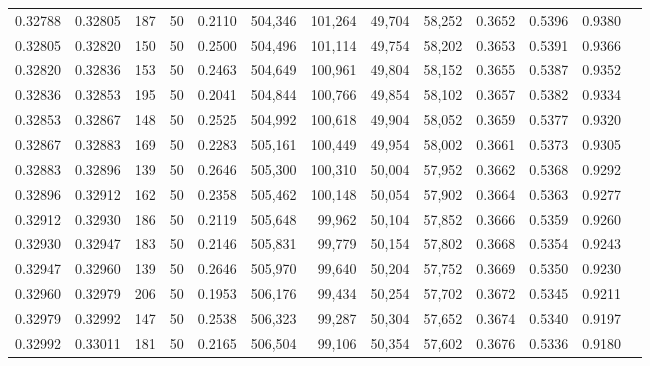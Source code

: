 \begin{tabular}{rrrrrrrrrrrrr}
0.32788 & 0.32805 &   187 &  50 &                                     0.2110 & 504,346 & 101,264 &  49,704 &  58,252 & 0.3652 & 0.5396 & 0.9380 \\
0.32805 & 0.32820 &   150 &  50 &                                     0.2500 & 504,496 & 101,114 &  49,754 &  58,202 & 0.3653 & 0.5391 & 0.9366 \\
0.32820 & 0.32836 &   153 &  50 &                                     0.2463 & 504,649 & 100,961 &  49,804 &  58,152 & 0.3655 & 0.5387 & 0.9352 \\
0.32836 & 0.32853 &   195 &  50 &                                     0.2041 & 504,844 & 100,766 &  49,854 &  58,102 & 0.3657 & 0.5382 & 0.9334 \\
0.32853 & 0.32867 &   148 &  50 &                                     0.2525 & 504,992 & 100,618 &  49,904 &  58,052 & 0.3659 & 0.5377 & 0.9320 \\
0.32867 & 0.32883 &   169 &  50 &                                     0.2283 & 505,161 & 100,449 &  49,954 &  58,002 & 0.3661 & 0.5373 & 0.9305 \\
0.32883 & 0.32896 &   139 &  50 &                                     0.2646 & 505,300 & 100,310 &  50,004 &  57,952 & 0.3662 & 0.5368 & 0.9292 \\
0.32896 & 0.32912 &   162 &  50 &                                     0.2358 & 505,462 & 100,148 &  50,054 &  57,902 & 0.3664 & 0.5363 & 0.9277 \\
0.32912 & 0.32930 &   186 &  50 &                                     0.2119 & 505,648 &  99,962 &  50,104 &  57,852 & 0.3666 & 0.5359 & 0.9260 \\
0.32930 & 0.32947 &   183 &  50 &                                     0.2146 & 505,831 &  99,779 &  50,154 &  57,802 & 0.3668 & 0.5354 & 0.9243 \\
0.32947 & 0.32960 &   139 &  50 &                                     0.2646 & 505,970 &  99,640 &  50,204 &  57,752 & 0.3669 & 0.5350 & 0.9230 \\
0.32960 & 0.32979 &   206 &  50 &                                     0.1953 & 506,176 &  99,434 &  50,254 &  57,702 & 0.3672 & 0.5345 & 0.9211 \\
0.32979 & 0.32992 &   147 &  50 &                                     0.2538 & 506,323 &  99,287 &  50,304 &  57,652 & 0.3674 & 0.5340 & 0.9197 \\
0.32992 & 0.33011 &   181 &  50 &                                     0.2165 & 506,504 &  99,106 &  50,354 &  57,602 & 0.3676 & 0.5336 & 0.9180 \\

\end{tabular}
